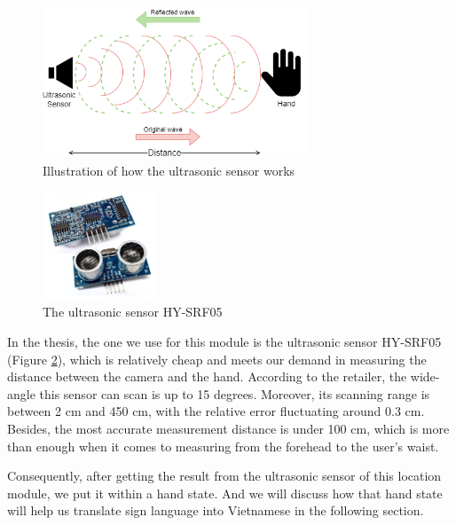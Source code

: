 \begin{figure}[H]
	\centering
	\includegraphics[width=0.7\textwidth]{img/Chap4/UltrasonicSensorFunction.png}
	\caption{Illustration of how the ultrasonic sensor works}
	\label{fig:Chap4-UltrasonicSensorFunction}
\end{figure}

\begin{figure}
  \begin{center}
  	\includegraphics[width=0.3\textwidth]{img/Chap4/UltrasonicSensor.jpeg}
  \end{center}
	\caption{The ultrasonic sensor HY-SRF05}
  \label{fig:Chap4-UltrasonicSensorHYSRF05}
\end{figure}

In the thesis, the one we use for this module is the ultrasonic sensor HY-SRF05 (Figure \ref{fig:Chap4-UltrasonicSensorHYSRF05}), which is relatively cheap and meets our demand in measuring the distance between the camera and the hand. According to the retailer, the wide-angle this sensor can scan is up to 15 degrees. Moreover, its scanning range is between 2 cm and 450 cm, with the relative error fluctuating around 0.3 cm. Besides, the most accurate measurement distance is under 100 cm, which is more than enough when it comes to measuring from the forehead to the user's waist.


Consequently, after getting the result from the ultrasonic sensor of this location module, we put it within a hand state. And we will discuss how that hand state will help us translate sign language into Vietnamese in the following section.

